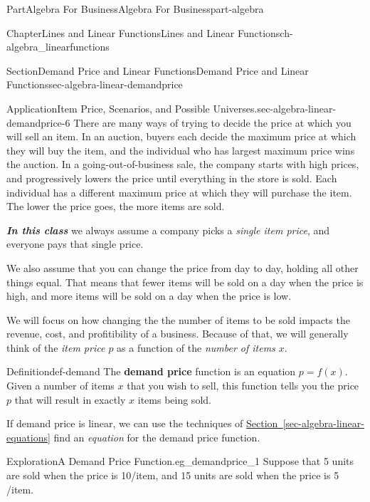 \documentclass[oneside,10pt,]{tufte-book}
\newcommand{\xreffont}{\relax}
\newcommand{\alert}[1]{\textbf{\textit{#1}}}
\newcommand{\terminology}[1]{\textbf{#1}}
\numberwithin{equation}{chapter}
\begin{document}
\begin{partptx}{Part}{Algebra For Business}{}{Algebra For Business}{}{}{part-algebra}
\begin{chapterptx}{Chapter}{Lines and Linear Functions}{}{Lines and Linear Functions}{}{}{ch-algebra_linearfunctions}
\begin{sectionptx}{Section}{Demand Price and Linear Functions}{}{Demand Price and Linear Functions}{}{}{sec-algebra-linear-demandprice}
\begin{insight}{Application}{Item Price, Scenarios, and Possible Universes.}{sec-algebra-linear-demandprice-6}
There are many ways of trying to decide the price at which you will sell an item. In an auction, buyers each decide the maximum price at which they will buy the item, and the individual who has largest maximum price wins the auction. In a going-out-of-business sale, the company starts with high prices, and progressively lowers the price until everything in the store is sold. Each individual has a different maximum price at which they will purchase the item.  The lower the price goes, the more items are sold.%
\par
\alert{In this class} we always assume a company picks a \emph{single item price}, and everyone pays that single price.%
\par
We also assume that you can change the price from day to day, holding all other things equal.  That means that fewer items will be sold on a day when the price is high, and more items will be sold on a day when the price is low.%
\end{insight}
We will  focus on how changing the the number of items to be sold impacts the revenue, cost, and profitibility of a business. Because of that, we will generally think of the \emph{item price \(p\)}  as a function of the \emph{number of items \(x\)}.%
\begin{definition}{Definition}{}{def-demand}%
The \terminology{demand price} function is an equation \(p = f(x)\). Given a number of items \(x\) that you wish to sell, this function tells you the price \(p\) that will result in exactly \(x\) items being sold.%
\end{definition}
If demand price is linear, we can use the techniques of \hyperref[sec-algebra-linear-equations]{Section~{\xreffont\ref{sec-algebra-linear-equations}}} find an \emph{equation} for the demand price function.%
\begin{exploration}{Exploration}{A Demand Price Function.}{eg_demandprice_1}%
Suppose that 5 units are sold when the price is 10\textdollar{}\slash{}item, and 15 units are sold when the price is 5 \textdollar{}\slash{}item.%
\begin{image}{0}{1}{0}{}%
\end{image}
\end{exploration}
\end{sectionptx}
\end{chapterptx}
\end{partptx}
\end{document}
